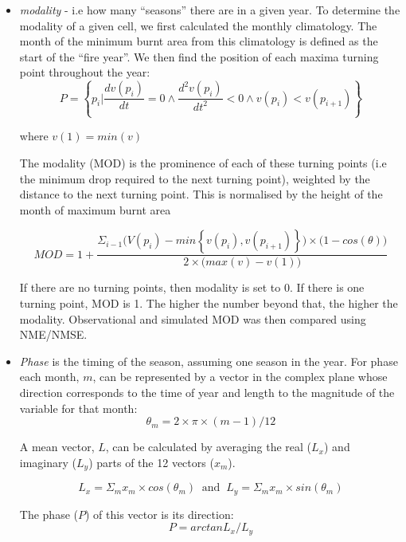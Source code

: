 \documentclass[bg, manuscript]{copernicus}
\begin{document}
\begin{itemize}
    \item \textit{modality} - i.e how many “seasons” there are in a given year. To determine the modality of a given cell, we first calculated the monthly climatology. The month of the minimum burnt area from this climatology is defined as the start of the “fire year”. We then find the position of each maxima turning point throughout the year:	
\begin{equation}
    P = \left\{p_i | \frac{dv(p_i)}{dt} = 0 \wedge \frac{d^2v(p_i)}{dt^2} < 0 \wedge v(p_i) < v(p_{i+1}) \right\}
\end{equation}

where $v(1) = min(v)$

The modality (MOD) is the prominence of each of these turning points (i.e the minimum drop required to the next turning point), weighted by the distance to the next turning point. This is normalised by the height of the month of maximum burnt area

\begin{equation}
    MOD =1 + \frac{ \Sigma_{i-1} \big( V(p_i) - min\left\{ v(p_i), v(p_{i+1}) \right\} \big) \times \big( 1 - cos(\theta) \big)}{2 \times \big(max(v) - v(1) \big)}
\end{equation}

If there are no turning points, then modality is set to 0. If there is one turning point, MOD is 1. The higher the number beyond that, the higher the modality. Observational and simulated MOD  was then compared using NME/NMSE.

    \item \textit{Phase} is the timing of the season, assuming one season in the year. For phase each month, $m$, can be represented by a vector in the complex plane whose direction corresponds to the time of year and length to the magnitude of the variable for that month:
\begin{equation}
    \theta_m = 2 \times \pi \times (m-1) / 12
\end{equation}

A mean vector, $L$, can be calculated by averaging the real ($L_x$) and imaginary ($L_y$) parts of the 12 vectors ($x_m$).

\begin{equation}
    L_x = \Sigma_m x_m \times cos(\theta_m) \ \text{   and   } \
    L_y = \Sigma_m x_m \times sin(\theta_m)
\end{equation}

The phase ($P$) of this vector is its direction:
\begin{equation}
    P  = arctan{L_x/L_y}
\end{equation}


\end{itemize}
\end{document}
